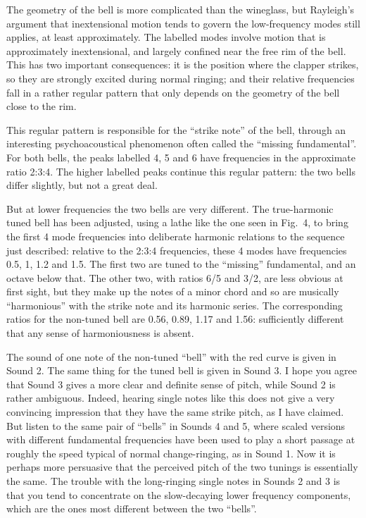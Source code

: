   The geometry of the bell is more complicated than the wineglass, but 
  Rayleigh's argument that inextensional motion tends to govern the 
  low-frequency modes still applies, at least approximately. The labelled modes 
  involve motion that is approximately inextensional, and largely confined near 
  the free rim of the bell. This has two important consequences: it is the 
  position where the clapper strikes, so they are strongly excited during 
  normal ringing; and their relative frequencies fall in a rather regular 
  pattern that only depends on the geometry of the bell close to the rim. 

  This regular pattern is responsible for the ``strike note'' of the bell, 
  through an interesting psychoacoustical phenomenon often called the ``missing 
  fundamental''. For both bells, the peaks labelled 4, 5 and 6 have frequencies 
  in the approximate ratio 2:3:4. The higher labelled peaks continue this 
  regular pattern: the two bells differ slightly, but not a great deal. 

  But at lower frequencies the two bells are very different. The true-harmonic 
  tuned bell has been adjusted, using a lathe like the one seen in Fig.\ 4, to 
  bring the first 4 mode frequencies into deliberate harmonic relations to the 
  sequence just described: relative to the 2:3:4 frequencies, these 4 modes 
  have frequencies 0.5, 1, 1.2 and 1.5. The first two are tuned to the 
  ``missing'' fundamental, and an octave below that. The other two, with ratios 
  6/5 and 3/2, are less obvious at first sight, but they make up the notes of a 
  minor chord and so are musically ``harmonious'' with the strike note and its 
  harmonic series. The corresponding ratios for the non-tuned bell are 0.56, 
  0.89, 1.17 and 1.56: sufficiently different that any sense of harmoniousness 
  is absent. 

  The sound of one note of the non-tuned ``bell'' with the red curve is given 
  in Sound 2. The same thing for the tuned bell is given in Sound 3. I hope you 
  agree that Sound 3 gives a more clear and definite sense of pitch, while 
  Sound 2 is rather ambiguous. Indeed, hearing single notes like this does not 
  give a very convincing impression that they have the same strike pitch, as I 
  have claimed. But listen to the same pair of ``bells'' in Sounds 4 and 5, 
  where scaled versions with different fundamental frequencies have been used 
  to play a short passage at roughly the speed typical of normal 
  change-ringing, as in Sound 1. Now it is perhaps more persuasive that the 
  perceived pitch of the two tunings is essentially the same. The trouble with 
  the long-ringing single notes in Sounds 2 and 3 is that you tend to 
  concentrate on the slow-decaying lower frequency components, which are the 
  ones most different between the two ``bells''. 

